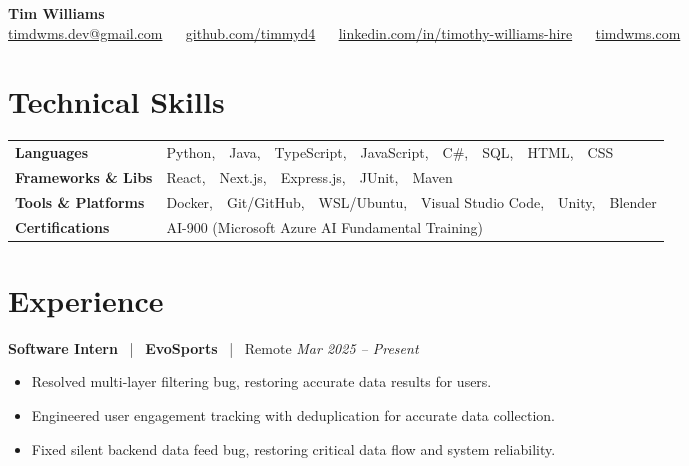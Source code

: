 \documentclass[10pt, letterpaper]{article}
\newcommand{\jobhead}[4]{%
  \vspace{5pt}%
  {\bfseries\color{dark}#1}%
  ~{\color{light}|}~%
  {\bfseries\color{navy}#2}%
  ~{\color{light}|}~%
  {\color{light}#3}%
  \hfill{\color{light}\small\textit{#4}}\\[-2pt]%
}
\newcommand{\skillrow}[2]{%
  {\bfseries #1} & #2 \\[2pt]%
}
\begin{document}

\begin{center}
  {\huge\bfseries\color{navy} Tim Williams}\\[4pt]
  {\small\color{light}
    \href{mailto:timdwms.dev@gmail.com}{timdwms.dev@gmail.com}
    ~\textbullet~
    \href{https://github.com/timmyd4}{github.com/timmyd4}
    ~\textbullet~
    \href{https://www.linkedin.com/in/timothy-williams-hire}{linkedin.com/in/timothy-williams-hire}
    ~\textbullet~
    \href{https://timdwms.com}{timdwms.com}
  }
\end{center}

\vspace{2pt}

\section{Technical Skills}

\begin{tabular}{@{}p{1.6in} p{5.2in}@{}}
  \skillrow{Languages}{Python,\ \ Java,\ \ TypeScript,\ \ JavaScript,\ \ C\#,\ \ SQL,\ \ HTML,\ \ CSS}
  \skillrow{Frameworks \& Libs}{React,\ \ Next.js,\ \ Express.js,\ \ JUnit,\ \ Maven}
  \skillrow{Tools \& Platforms}{Docker,\ \ Git/GitHub,\ \ WSL/Ubuntu,\ \ Visual Studio Code,\ \ Unity,\ \ Blender}
  \skillrow{Certifications}{AI-900 (Microsoft Azure AI Fundamental Training)}
\end{tabular}

\section{Experience}

\jobhead{Software Intern}{EvoSports}{Remote}{Mar 2025 – Present}
\begin{itemize}
  \item Resolved multi-layer filtering bug, restoring accurate data results for users.
  \item Engineered user engagement tracking with deduplication for accurate data collection.
  \item Fixed silent backend data feed bug, restoring critical data flow and system reliability.
\end{itemize}
\end{document}
